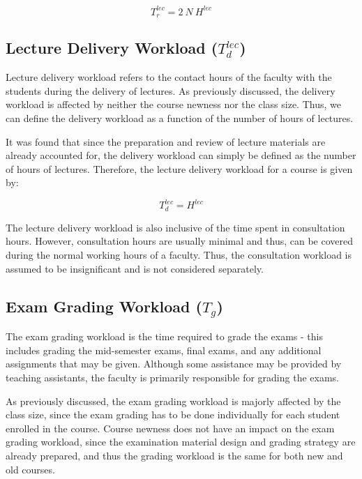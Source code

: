 \begin{equation}
  \label{eqn:review-workload-total}
  T_r^{lec} = 2\ N \ H^{lec}
\end{equation}


\subsection{Lecture Delivery Workload (\texorpdfstring{$T_d^{lec}$}{})}

Lecture delivery workload refers to the contact hours of the faculty with the students during the delivery of lectures. As previously discussed, the delivery workload is affected by neither the course newness nor the class size. Thus, we can define the delivery workload as a function of the number of hours of lectures.

It was found that since the preparation and review of lecture materials are already accounted for, the delivery workload can simply be defined as the number of hours of lectures. Therefore, the lecture delivery workload for a course is given by:

\begin{equation}
  \label{eqn:lecture-delivery-workload}
  T_d^{lec} = H^{lec}
\end{equation}

The lecture delivery workload is also inclusive of the time spent in consultation hours. However, consultation hours are usually minimal and thus, can be covered during the normal working hours of a faculty. Thus, the consultation workload is assumed to be insignificant and is not considered separately.

\subsection{Exam Grading Workload (\texorpdfstring{\(T_g\)}{})}
\label{sec:exam_grading}

The exam grading workload is the time required to grade the exams - this includes grading the mid-semester exams, final exams, and any additional assignments that may be given. Although some assistance may be provided by teaching assistants, the faculty is primarily responsible for grading the exams.

As previously discussed, the exam grading workload is majorly affected by the class size, since the exam grading has to be done individually for each student enrolled in the course. Course newness does not have an impact on the exam grading workload, since the examination material design and grading strategy are already prepared, and thus the grading workload is the same for both new and old courses.


